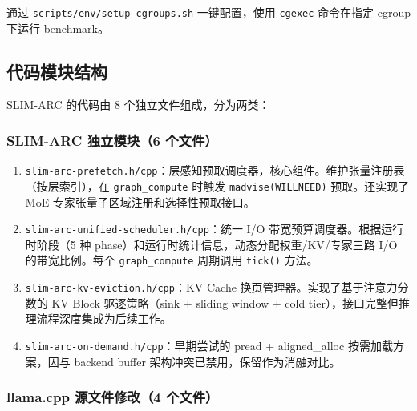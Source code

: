 通过 \texttt{scripts/env/setup-cgroups.sh} 一键配置，使用 \texttt{cgexec} 命令在指定 cgroup 下运行 benchmark。

\subsection{代码模块结构}

SLIM-ARC 的代码由 8 个独立文件组成，分为两类：

\subsubsection{SLIM-ARC 独立模块（6 个文件）}

\begin{enumerate}
    \item \texttt{slim-arc-prefetch.h/cpp}：层感知预取调度器，核心组件。维护张量注册表（按层索引），在 \texttt{graph\_compute} 时触发 \texttt{madvise(WILLNEED)} 预取。还实现了 MoE 专家张量子区域注册和选择性预取接口。
    
    \item \texttt{slim-arc-unified-scheduler.h/cpp}：统一 I/O 带宽预算调度器。根据运行时阶段（5 种 phase）和运行时统计信息，动态分配权重/KV/专家三路 I/O 的带宽比例。每个 \texttt{graph\_compute} 周期调用 \texttt{tick()} 方法。
    
    \item \texttt{slim-arc-kv-eviction.h/cpp}：KV Cache 换页管理器。实现了基于注意力分数的 KV Block 驱逐策略（sink + sliding window + cold tier），接口完整但推理流程深度集成为后续工作。
    
    \item \texttt{slim-arc-on-demand.h/cpp}：早期尝试的 pread + aligned\_alloc 按需加载方案，因与 backend buffer 架构冲突已禁用，保留作为消融对比。
\end{enumerate}

\subsubsection{llama.cpp 源文件修改（4 个文件）}

